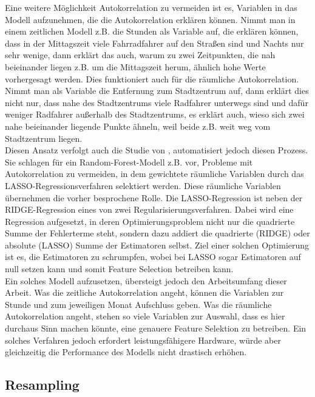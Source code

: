 \documentclass[a4paper,12pt]{thesis}
\begin{document}
Eine weitere Möglichkeit Autokorrelation zu vermeiden ist es, Variablen in das Modell aufzunehmen, die die Autokorrelation erklären können. Nimmt man in einem zeitlichen Modell z.B. die Stunden als Variable auf, die erklären können, dass in der Mittagszeit viele Fahrradfahrer auf den Straßen sind und Nachts nur sehr wenige, dann erklärt das auch, warum zu zwei Zeitpunkten, die nah beieinander liegen z.B. um die Mittagszeit herum, ähnlich hohe Werte vorhergesagt werden. Dies funktioniert auch für die räumliche Autokorrelation. Nimmt man als Variable die Entfernung zum Stadtzentrum auf, dann erklärt dies nicht nur, dass nahe des Stadtzentrums viele Radfahrer unterwegs sind und dafür weniger Radfahrer außerhalb des Stadtzentrums, es erklärt auch, wieso sich zwei nahe beieinander liegende Punkte ähneln, weil beide z.B. weit weg vom Stadtzentrum liegen.\\
Diesen Ansatz verfolgt auch die Studie von \cite{LiuAutocorrelation2022}, automatisiert jedoch diesen Prozess. Sie schlagen für ein Random-Forest-Modell z.B. vor, Probleme mit Autokorrelation zu vermeiden, in dem gewichtete räumliche Variablen durch das LASSO-Regressionsverfahren selektiert werden. Diese räumliche Variablen übernehmen die vorher besprochene Rolle. Die LASSO-Regression ist neben der RIDGE-Regression eines von zwei Regularisierungsverfahren. Dabei wird eine Regression aufgesetzt, in deren Optimierungsproblem nicht nur die quadrierte Summe der Fehlerterme steht, sondern dazu addiert die quadrierte (RIDGE) oder absolute (LASSO) Summe der Estimatoren selbst. Ziel einer solchen Optimierung ist es, die Estimatoren zu schrumpfen, wobei bei LASSO sogar Estimatoren auf null setzen kann und somit Feature Selection betreiben kann.\\
Ein solches Modell aufzusetzen, übersteigt jedoch den Arbeitsumfang dieser Arbeit. Was die zeitliche Autokorrelation angeht, können die Variablen zur Stunde und zum jeweiligen Monat Aufschluss geben. Was die räumliche Autokorrelation angeht, stehen so viele Variablen zur Auswahl, dass es hier durchaus Sinn machen könnte, eine genauere Feature Selektion zu betreiben. Ein solches Verfahren jedoch erfordert leistungsfähigere Hardware, würde aber gleichzeitig die Performance des Modells nicht drastisch erhöhen.

\subsection{Resampling}
\end{document}
